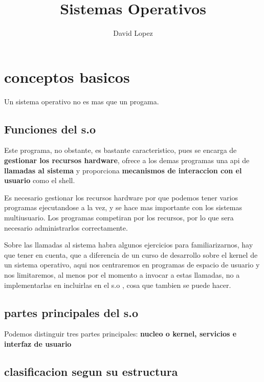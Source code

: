 \documentclass[12pt, letterpaper]{article}
\title{Sistemas Operativos}
\author{David Lopez}
\date
\begin{document}
\begin{titlepage}
	\clearpage\maketitle
	\thispagestyle{empty}
\end{titlepage}

\tableofcontents{}

\section{conceptos basicos}

Un sistema operativo no es mas que un progama.

\subsection{Funciones del s.o}
Este programa, no obstante, es bastante caracteristico, pues se encarga de \textbf{gestionar los recursos hardware}, ofrece a los demas programas una api de \textbf{llamadas al sistema} y proporciona \textbf{mecanismos de interaccion con el usuario} como el shell.\par

Es necesario gestionar los recursos hardware por que podemos tener varios programas ejecutandose a la vez, y se hace mas importante con los sistemas multiusuario. Los programas competiran por los recursos, por lo que sera necesario administrarlos correctamente.\par

Sobre las llamadas al sistema habra algunos ejercicios para familiarizarnos, hay que tener en cuenta, que a diferencia de un curso de desarrollo sobre el kernel de un sistema operativo, aqui nos centraremos en programas de espacio de usuario y nos limitaremos, al menos por el momento a invocar a estas llamadas, no a implementarlas en incluirlas en el s.o , cosa que tambien se puede hacer.

\subsection{partes principales del s.o}

Podemos distinguir tres partes principales: \textbf{nucleo o kernel, servicios e interfaz de usuario}

\subsection{clasificacion segun su estructura}
\end{document}

